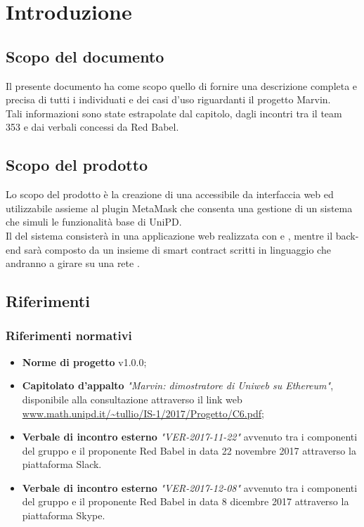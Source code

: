 \documentclass[AnalisiDeiRequisiti.tex]{subfiles}
\begin{document}
\chapter{Introduzione}
\section{Scopo del documento}
Il presente documento ha come scopo quello di fornire una descrizione completa e precisa di tutti i  individuati e dei casi d'uso riguardanti il progetto Marvin.\\
Tali informazioni sono state estrapolate dal capitolo, dagli incontri tra il team 353 e dai verbali concessi da Red Babel.

\section{Scopo del prodotto}
Lo scopo del prodotto è la creazione di una  accessibile da interfaccia web ed utilizzabile assieme al plugin MetaMask che consenta una gestione di un sistema che simuli le funzionalità base di UniPD.\\
Il  del sistema consisterà in una applicazione web realizzata con  e , mentre il back-end sarà composto da un insieme di smart contract scritti in linguaggio  che andranno a girare su una rete .\\

\glossExpl

\section{Riferimenti}

\subsection{Riferimenti normativi}

\begin{itemize}
	\item \textbf{Norme di progetto} v1.0.0;\\
	\item \textbf{Capitolato d'appalto} \textit{"Marvin: dimostratore di Uniweb su Ethereum"}, disponibile alla consultazione attraverso il link web \url{www.math.unipd.it/~tullio/IS-1/2017/Progetto/C6.pdf};\\
	\item \textbf{Verbale di incontro esterno} \textit{"VER-2017-11-22"} avvenuto tra i componenti del gruppo e il proponente Red Babel in data 22 novembre 2017 attraverso la piattaforma Slack.
	\item \textbf{Verbale di incontro esterno} \textit{"VER-2017-12-08"} avvenuto tra i componenti del gruppo e il proponente Red Babel in data 8 dicembre 2017 attraverso la piattaforma Skype.
\end{itemize}
\end{document}
